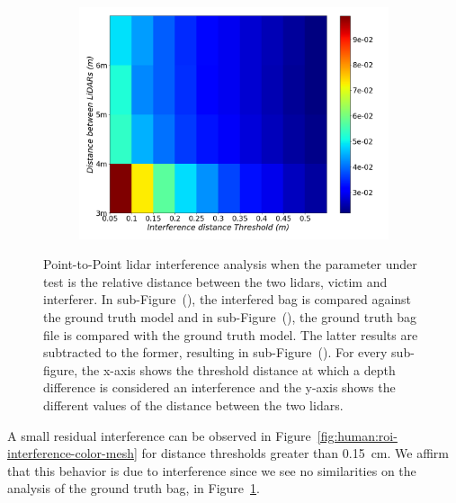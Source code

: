 \begin{figure}[!ht]
\begin{subfigure}[c]{0.45\textwidth}
		\caption{}
		\label{fig:human:roi-ground-truth-color-mesh}
	\end{subfigure}
	\\ \vspace{2mm}
	\begin{subfigure}[c]{0.6\textwidth}
		\centering
		\includegraphics[width=\textwidth]{img/lidar-interference/human/difference_roi_distance_color_mesh.png}
		\caption{}
		\label{fig:human:roi-difference-color-mesh}
	\end{subfigure}

	\caption[Point-to-Point analysis of the interference on the seleced \acs{roi} of the \textit{Human} dataset.]{Point-to-Point \ac{lidar} interference analysis when the parameter under test is the relative distance between the two \acp{lidar}, victim and interferer. In sub-Figure~(), the interfered bag is compared against the ground truth model and in sub-Figure~(), the ground truth bag file is compared with the ground truth model. The latter results are subtracted to the former, resulting in sub-Figure~(). For every sub-figure, the x-axis shows the threshold distance at which a depth difference is considered an interference and the y-axis shows the different values of the distance between the two \acp{lidar}.} 
	\label{fig:human:roi-color-mesh}
\end{figure}

A small residual interference can be observed in Figure~\ref{fig:human:roi-interference-color-mesh} for distance thresholds greater than \SI{0.15}{\centi\meter}. We affirm that this behavior is due to interference since we see no similarities on the analysis of the ground truth bag, in Figure~\ref{fig:human:roi-ground-truth-color-mesh}.

